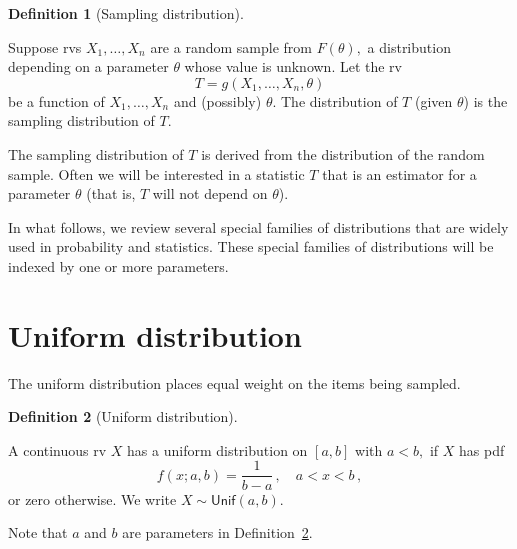 \documentclass[
  a4paper,
  DIV=11,
  numbers=noendperiod,
  oneside]{scrreprt}
\theoremstyle{plain}
\theoremstyle{definition}
\newtheorem{definition}{Definition}[chapter]
\theoremstyle{definition}
\theoremstyle{definition}
\theoremstyle{plain}
\theoremstyle{remark}
\begin{document}
\begin{definition}[Sampling
distribution]\protect\hypertarget{def-sampling-dist}{}\label{def-sampling-dist}

Suppose rvs \(X_1, \dots, X_n\) are a random sample from \(F(\theta),\)
a distribution depending on a parameter \(\theta\) whose value is
unknown. Let the rv \[T = g(X_1, \dots, X_n, \theta)\] be a function of
\(X_1, \dots, X_n\) and (possibly) \(\theta\). The distribution of \(T\)
(given \(\theta\)) is the sampling distribution of \(T\).

\end{definition}

The sampling distribution of \(T\) is derived from the distribution of
the random sample. Often we will be interested in a statistic \(T\) that
is an estimator for a parameter \(\theta\) (that is, \(T\) will not
depend on \(\theta\)).

In what follows, we review several special families of distributions
that are widely used in probability and statistics. These special
families of distributions will be indexed by one or more parameters.

\section{Uniform distribution}\label{sec-uniform-distribution}

The uniform distribution places equal weight on the items being sampled.

\begin{definition}[Uniform
distribution]\protect\hypertarget{def-uniform-dist}{}\label{def-uniform-dist}

A continuous rv \(X\) has a uniform distribution on \([a,b]\) with
\(a<b,\) if \(X\) has pdf \[
 f(x; a,b) = \frac{1}{b-a}\,, 
 \quad a < x < b\,,
\] or zero otherwise. We write \(X \sim \mathsf{Unif}(a,b)\).

\end{definition}

\begin{tcolorbox}[enhanced jigsaw, colframe=quarto-callout-warning-color-frame, rightrule=.15mm, coltitle=black, colback=white, leftrule=.75mm, opacityback=0, opacitybacktitle=0.6, left=2mm, colbacktitle=quarto-callout-warning-color!10!white, arc=.35mm, title=\textcolor{quarto-callout-warning-color}{\faExclamationTriangle}\hspace{0.5em}{Parameters}, bottomtitle=1mm, toptitle=1mm, titlerule=0mm, bottomrule=.15mm, breakable, toprule=.15mm]

Note that \(a\) and \(b\) are parameters in
Definition~\ref{def-uniform-dist}.

\end{tcolorbox}
\end{document}
